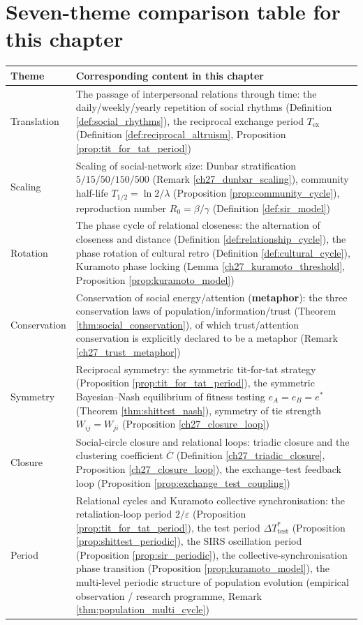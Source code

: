 \section*{Seven-theme comparison table for this chapter}
\begin{center}
\begin{tabular}{>{\centering\arraybackslash}p{2.8cm}>{\centering\arraybackslash}p{8.9cm}}
\toprule
Theme & Corresponding content in this chapter \\
\midrule
Translation & The passage of interpersonal relations through time: the daily/weekly/yearly repetition of social rhythms (Definition \ref{def:social_rhythms}), the reciprocal exchange period $T_{\text{ex}}$ (Definition \ref{def:reciprocal_altruism}, Proposition \ref{prop:tit_for_tat_period}) \\
Scaling & Scaling of social-network size: Dunbar stratification $5/15/50/150/500$ (Remark \ref{ch27_dunbar_scaling}), community half-life $T_{1/2}=\ln2/\lambda$ (Proposition \ref{prop:community_cycle}), reproduction number $R_0=\beta/\gamma$ (Definition \ref{def:sir_model}) \\
Rotation & The phase cycle of relational closeness: the alternation of closeness and distance (Definition \ref{def:relationship_cycle}), the phase rotation of cultural retro (Definition \ref{def:cultural_cycle}), Kuramoto phase locking (Lemma \ref{ch27_kuramoto_threshold}, Proposition \ref{prop:kuramoto_model}) \\
Conservation & Conservation of social energy/attention (\textbf{metaphor}): the three conservation laws of population/information/trust (Theorem \ref{thm:social_conservation}), of which trust/attention conservation is explicitly declared to be a metaphor (Remark \ref{ch27_trust_metaphor}) \\
Symmetry & Reciprocal symmetry: the symmetric tit-for-tat strategy (Proposition \ref{prop:tit_for_tat_period}), the symmetric Bayesian--Nash equilibrium of fitness testing $e_A=e_B=e^*$ (Theorem \ref{thm:shittest_nash}), symmetry of tie strength $W_{ij}=W_{ji}$ (Proposition \ref{ch27_closure_loop}) \\
Closure & Social-circle closure and relational loops: triadic closure and the clustering coefficient $\overline{C}$ (Definition \ref{ch27_triadic_closure}, Proposition \ref{ch27_closure_loop}), the exchange--test feedback loop (Proposition \ref{prop:exchange_test_coupling}) \\
Period & Relational cycles and Kuramoto collective synchronisation: the retaliation-loop period $2/\varepsilon$ (Proposition \ref{prop:tit_for_tat_period}), the test period $\Delta T_{\text{test}}^*$ (Proposition \ref{prop:shittest_periodic}), the SIRS oscillation period (Proposition \ref{prop:sir_periodic}), the collective-synchronisation phase transition (Proposition \ref{prop:kuramoto_model}), the multi-level periodic structure of population evolution (empirical observation / research programme, Remark \ref{thm:population_multi_cycle}) \\
\bottomrule
\end{tabular}
\end{center}

